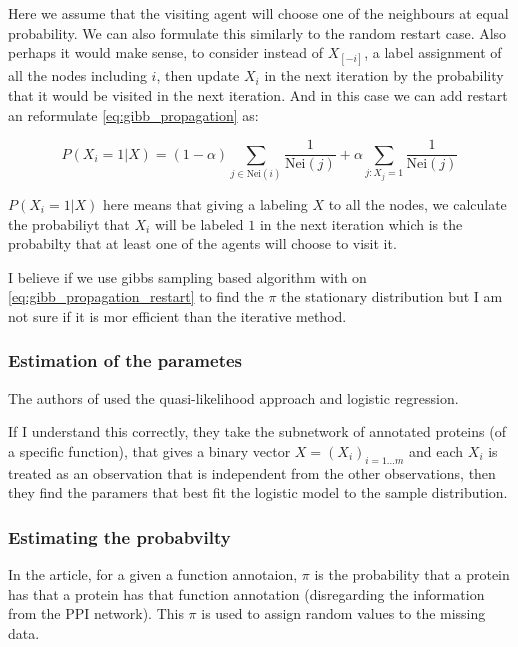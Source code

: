 \documentclass[a4paper,10pt]{article}
\theoremstyle{definition}
\theoremstyle{remark}
\theoremstyle{plain}
\begin{document}
Here we assume that the visiting agent will choose one of the neighbours at
equal probability. We can also formulate this similarly to the random restart
case. Also perhaps it would make sense, to consider instead of $X_{[-i]}$, a
label assignment of all the nodes including $i$, then update $X_i$ in the next
iteration by the probability that it would be visited in the next iteration.
And in this case we can add restart an reformulate \eqref{eq:gibb_propagation}
as: 

\begin{equation}
\label{eq:gibb_propagation_restart}
P(X_i=1 | X) = 
(1-\alpha) \sum_{j \in \text{Nei}(i)} \frac{1}{\text{Nei}(j)}
+ \alpha \sum_{j : X_j=1} \frac{1}{\text{Nei}(j)}
\end{equation}

$P(X_i=1 | X)$ here means that giving a labeling $X$ to all the nodes, we
calculate the probabiliyt that $X_i$ will be labeled $1$ in the next iteration
which is the probabilty that at least one of the agents will choose to visit it.

I believe if we use gibbs sampling based algorithm with on \eqref{eq:gibb_propagation_restart}
to find the $\pi$ the stationary distribution but I am not sure if it is 
mor efficient than the iterative method. 

\subsubsection{Estimation of the parametes}
The authors of \textcite{deng2002prediction} used the quasi-likelihood
approach and logistic regression.

If I understand this correctly, they take the subnetwork of annotated proteins
(of a specific function), that gives a binary vector $X = (X_i)_{i=1 \dots m}$
and each $X_i$ is treated as an observation that is independent from the other
observations, then they find the paramers that best fit the logistic model to
the sample distribution.


\subsubsection{Estimating the probabvilty}
In the article, for a given a function annotaion, 
$\pi$ is the probability that a protein has that  
a protein has that function annotation (disregarding the information
from the PPI network). This $\pi$ is used to assign random values to the missing
data.
\end{document}
